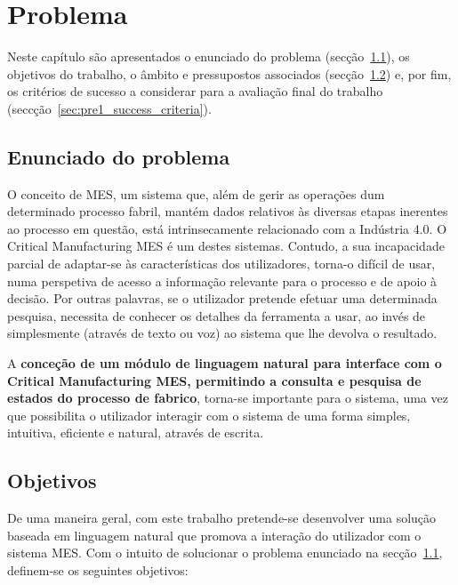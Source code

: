 \chapter{Problema}
\label{chap:pre1}

Neste capítulo são apresentados o enunciado do problema (secção~\ref{sec:pre1_problem}), os objetivos do trabalho, o âmbito e pressupostos associados (secção~\ref{sec:pre1_objectives}) e, por fim, os critérios de sucesso a considerar para a avaliação final do trabalho (seccção~\ref{sec:pre1_success_criteria}).

\section{Enunciado do problema}
\label{sec:pre1_problem}

O conceito de \gls{MES}, um sistema que, além de gerir as operações dum determinado processo fabril, mantém dados relativos às diversas etapas inerentes ao processo em questão, está intrinsecamente relacionado com a Indústria 4.0. O Critical Manufacturing \gls{MES} é um destes sistemas. Contudo, a sua incapacidade parcial de adaptar-se às características dos utilizadores, torna-o difícil de usar, numa perspetiva de acesso a informação relevante para o processo e de apoio à decisão. Por outras palavras, se o utilizador pretende efetuar uma determinada pesquisa, necessita de conhecer os detalhes da ferramenta a usar, ao invés de simplesmente  (através de texto ou voz) ao sistema que lhe devolva o resultado.

A \textbf{conceção de um módulo de linguagem natural para interface com o Critical Manufacturing \gls{MES}, permitindo a consulta e pesquisa de estados do processo de fabrico}, torna-se importante para o sistema, uma vez que possibilita o utilizador interagir com o sistema de uma forma simples, intuitiva, eficiente e natural, através de escrita.

\section{Objetivos}
\label{sec:pre1_objectives}
De uma maneira geral, com este trabalho pretende-se desenvolver uma solução baseada em linguagem natural que promova a interação do utilizador com o sistema \gls{MES}. Com o intuito de solucionar o problema enunciado na secção~\ref{sec:pre1_problem}, definem-se os seguintes objetivos:

